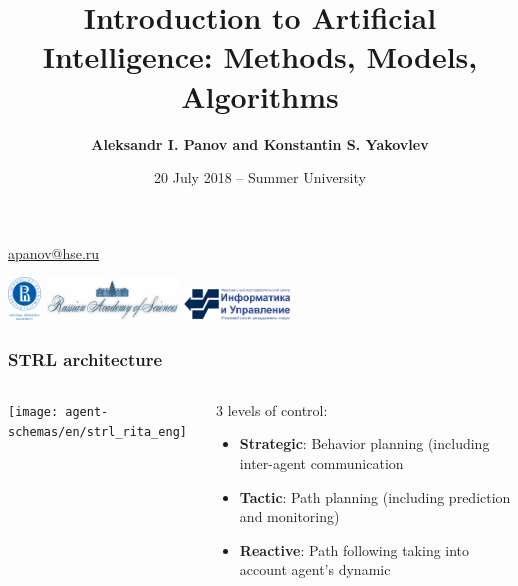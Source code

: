 \documentclass[default]{beamer}
\begin{document}
	
	\title[Introduction to AI]{Introduction to Artificial Intelligence: Methods, Models, Algorithms}
	\author[Panov]{\textbf{Aleksandr I. Panov and Konstantin S. Yakovlev}}
	\date{20 July 2018 -- Summer University} 
	
	{
		\begin{frame}
		
		\titlepage
		\centering
		\href{mailto:apanov@hse.ru}{apanov@hse.ru}
		
		\includegraphics[width=25pt]{hse.png} \hspace{10pt}
		\includegraphics[width=100pt]{ras_en.png} \hspace{10pt}
		\includegraphics[width=80pt]{frccsc.png}
		
	\end{frame}
	}

	\begin{frame}
		\frametitle{STRL architecture}
		
		\begin{columns}
			\begin{column}{0.6\textwidth}
				\centering
				\texttt{[image: agent-schemas/en/strl\_rita\_eng]}
			\end{column}
			\begin{column}{0.4\textwidth}
				3 levels of control:
				\begin{itemize}
					\item \textbf{Strategic}: Behavior planning (including inter-agent communication
					\item \textbf{Tactic}: Path planning (including prediction and monitoring)
					\item \textbf{Reactive}: Path following taking into account agent’s dynamic
				\end{itemize}
				\nocite{*}
				\printbibliography[keyword={strl}, resetnumbers=true]
			\end{column}
		\end{columns}
	\end{frame}
\end{document}
